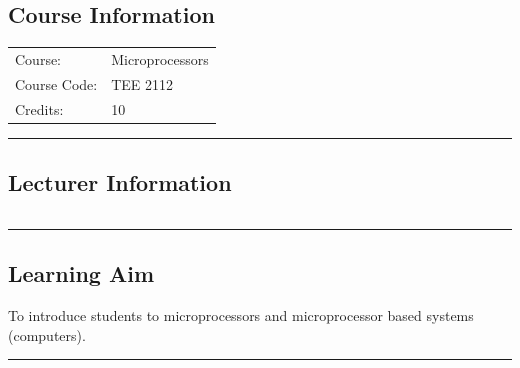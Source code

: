 
\subsection*{Course Information}\label{course:tee2112}
\vspace{0ex}%
\noindent\parbox{0.5\textwidth}{%
    \noindent\begin{tabular}{@{}ll}
                 \textsf{Course:}          & 	Microprocessors    \\
                 \textsf{Course Code:}         & 	TEE 2112    \\
                 \textsf{Credits:}    & 	10
    \end{tabular}}
\vspace{2ex}\hrule\vspace{2ex}

\subsection*{Lecturer Information}
\noindent\parbox{0.5\textwidth}{%
    \noindent\begin{tabular}{@{}ll}
                 
    \end{tabular}}
\vspace{2ex}\hrule\vspace{2ex}


\subsection*{Learning Aim}
To introduce students to microprocessors and microprocessor based systems (computers).
\vspace{2ex} \hrule\vspace{2ex}

